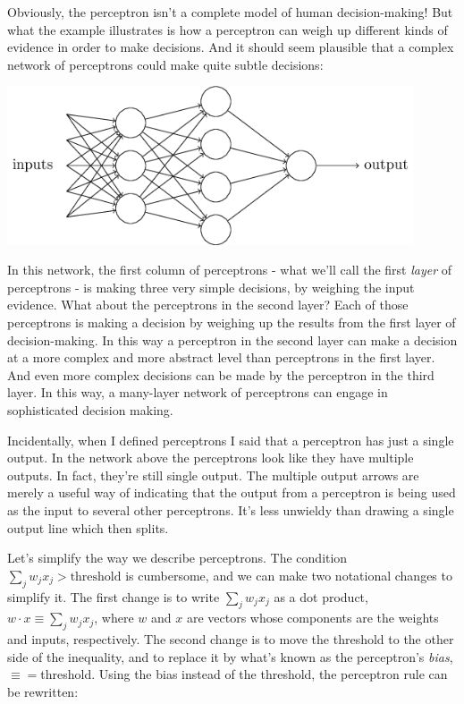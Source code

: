 Obviously, the perceptron isn't a complete model of human decision-making! But what the example illustrates is how a perceptron can weigh up different kinds of evidence in order to make decisions. And it should seem plausible that a complex network of perceptrons could make quite subtle decisions: 

{\centering
\includegraphics[width=0.9\textwidth,]{pic/three-layer-nn01}
\par}


In this network, the first column of perceptrons - what we'll call the first \textit{layer} of perceptrons - is making three very simple decisions, by weighing the input evidence. What about the perceptrons in the second layer? Each of those perceptrons is making a decision by weighing up the results from the first layer of decision-making. In this way a perceptron in the second layer can make a decision at a more complex and more abstract level than perceptrons in the first layer. And even more complex decisions can be made by the perceptron in the third layer. In this way, a many-layer network of perceptrons can engage in sophisticated decision making.

Incidentally, when I defined perceptrons I said that a perceptron has just a single output. In the network above the perceptrons look like they have multiple outputs. In fact, they're still single output. The multiple output arrows are merely a useful way of indicating that the output from a perceptron is being used as the input to several other perceptrons. It's less unwieldy than drawing a single output line which then splits.

Let's simplify the way we describe perceptrons. The condition 
$\sum_{j} w_{j} x_{j}> \textrm{threshold}$
is cumbersome, and we can make two notational changes to simplify it. The first change is to write
 $\sum_{j} w_{j} x_{j}$ as a dot product, $w \cdot x \equiv \sum_{j} w_{j} x_{j}$, where $w$ and $x$ are vectors whose components are the weights and inputs, respectively. The second change is to move the threshold to the other side of the inequality, and to replace it by what's known as the perceptron's \textit{bias}, $\equiv=$threshold. Using the bias instead of the threshold, the perceptron rule can be rewritten: 

